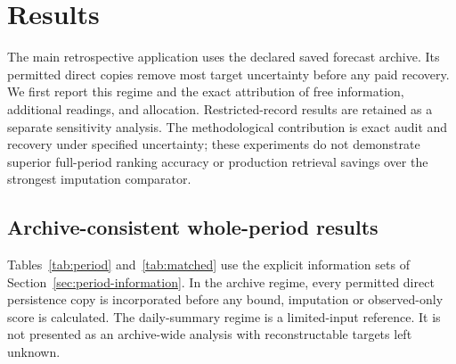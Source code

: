 \documentclass[12pt]{article}
\begin{document}
\section{Results}
The main retrospective application uses the declared saved forecast archive.
Its permitted direct copies remove most target uncertainty before any paid
recovery. We first report this regime and the exact attribution of free
information, additional readings, and allocation. Restricted-record results
are retained as a separate sensitivity analysis. The methodological
contribution is exact audit and recovery under specified uncertainty;
these experiments do not demonstrate superior full-period ranking accuracy
or production retrieval savings over the strongest imputation comparator.
\subsection{Archive-consistent whole-period results}
\label{sec:period-results}
Tables~\ref{tab:period} and~\ref{tab:matched} use the explicit information
sets of Section~\ref{sec:period-information}. In the archive regime,
every permitted direct persistence copy is incorporated before any bound,
imputation or observed-only score is calculated. The daily-summary regime
is a limited-input reference. It is not presented as an archive-wide
analysis with reconstructable targets left unknown.
\end{document}
